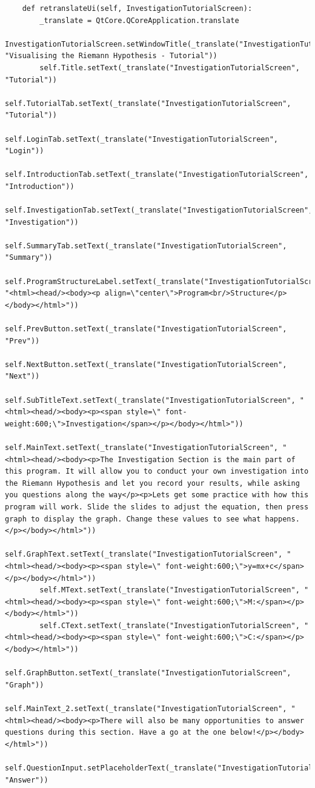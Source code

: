 \documentclass[12pt]{article}
\begin{document}
\begin{lstlisting}
    def retranslateUi(self, InvestigationTutorialScreen):
        _translate = QtCore.QCoreApplication.translate
        InvestigationTutorialScreen.setWindowTitle(_translate("InvestigationTutorialScreen", "Visualising the Riemann Hypothesis - Tutorial"))
        self.Title.setText(_translate("InvestigationTutorialScreen", "Tutorial"))
        self.TutorialTab.setText(_translate("InvestigationTutorialScreen", "Tutorial"))
        self.LoginTab.setText(_translate("InvestigationTutorialScreen", "Login"))
        self.IntroductionTab.setText(_translate("InvestigationTutorialScreen", "Introduction"))
        self.InvestigationTab.setText(_translate("InvestigationTutorialScreen", "Investigation"))
        self.SummaryTab.setText(_translate("InvestigationTutorialScreen", "Summary"))
        self.ProgramStructureLabel.setText(_translate("InvestigationTutorialScreen", "<html><head/><body><p align=\"center\">Program<br/>Structure</p></body></html>"))
        self.PrevButton.setText(_translate("InvestigationTutorialScreen", "Prev"))
        self.NextButton.setText(_translate("InvestigationTutorialScreen", "Next"))
        self.SubTitleText.setText(_translate("InvestigationTutorialScreen", "<html><head/><body><p><span style=\" font-weight:600;\">Investigation</span></p></body></html>"))
        self.MainText.setText(_translate("InvestigationTutorialScreen", "<html><head/><body><p>The Investigation Section is the main part of this program. It will allow you to conduct your own investigation into the Riemann Hypothesis and let you record your results, while asking you questions along the way</p><p>Lets get some practice with how this program will work. Slide the slides to adjust the equation, then press graph to display the graph. Change these values to see what happens.</p></body></html>"))
        self.GraphText.setText(_translate("InvestigationTutorialScreen", "<html><head/><body><p><span style=\" font-weight:600;\">y=mx+c</span></p></body></html>"))
        self.MText.setText(_translate("InvestigationTutorialScreen", "<html><head/><body><p><span style=\" font-weight:600;\">M:</span></p></body></html>"))
        self.CText.setText(_translate("InvestigationTutorialScreen", "<html><head/><body><p><span style=\" font-weight:600;\">C:</span></p></body></html>"))
        self.GraphButton.setText(_translate("InvestigationTutorialScreen", "Graph"))
        self.MainText_2.setText(_translate("InvestigationTutorialScreen", "<html><head/><body><p>There will also be many opportunities to answer questions during this section. Have a go at the one below!</p></body></html>"))
        self.QuestionInput.setPlaceholderText(_translate("InvestigationTutorialScreen", "Answer"))

\end{lstlisting}
\end{document}
